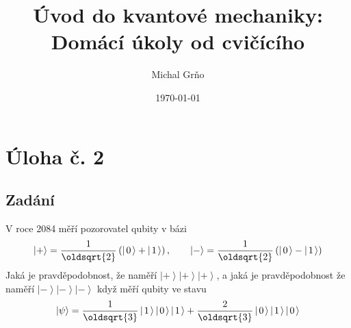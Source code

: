 \documentclass[10pt,a4paper]{article}
\newcommand*{\mask}[2]{%
    \mathord{\makebox[\widthof{\(#1\)}]{\(#2\)}}%
}
\newcommand{\ket}[1]{\left| #1 \right>}
\def\kzero{\ket{\mask{+}{0}}}
\def\kone{\ket{\mask{+}{1}}}
\def\kplus{\ket{+}}
\def\kminus{\ket{-}}
\begin{document}
\title{Úvod do kvantové mechaniky: Domácí úkoly od cvičícího}
\author{Michal Grňo}
\date{\today}

\maketitle

\section{Úloha č. 2}

\subsection{Zadání}
V roce 2084 měří pozorovatel qubity v bázi
\begin{equation*}
    \kplus = \frac{1}{\oldsqrt{2}} \left(\kzero + \kone\right),
    \hspace{2em}
    \kminus = \frac{1}{\oldsqrt{2}} \left(\kzero - \kone\right)
\end{equation*}
Jaká je pravděpodobnost, že naměří $\kplus\kplus\kplus$, a jaká je pravděpodobnost že naměří $\kminus\kminus\kminus$ když měří qubity ve stavu
\begin{equation*}
    \ket{\psi} = \frac{1}{\oldsqrt{3}} \kone\kzero\kone + \frac{2}{\oldsqrt{3}} \kzero\kone\kzero
\end{equation*}
\end{document}
